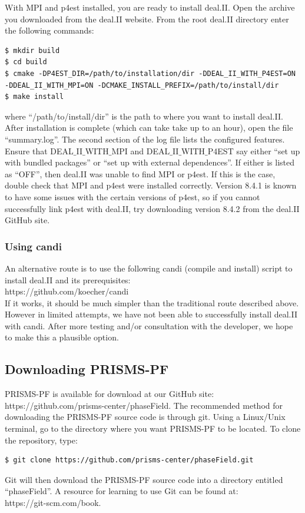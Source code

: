 \documentclass[10pt]{article} %
\begin{document}
With MPI and p4est installed, you are ready to install deal.II. Open the archive you downloaded from the deal.II website. From the root deal.II directory enter the following commands:
\begin{lstlisting}
$ mkdir build
$ cd build
$ cmake -DP4EST_DIR=/path/to/installation/dir -DDEAL_II_WITH_P4EST=ON 
-DDEAL_II_WITH_MPI=ON -DCMAKE_INSTALL_PREFIX=/path/to/install/dir
$ make install
\end{lstlisting}
where ``/path/to/install/dir'' is the path to where you want to install deal.II. After installation is complete (which can take take up to an hour), open the file ``summary.log''. The second section of the log file lists the configured features. Ensure that DEAL$\_$II$\_$WITH$\_$MPI and DEAL$\_$II$\_$WITH$\_$P4EST say either ``set up with bundled packages'' or ``set up with external dependences''. If either is listed as ``OFF'', then deal.II was unable to find MPI or p4est. If this is the case, double check that MPI and p4est were installed correctly. Version 8.4.1 is known to have some issues with the certain versions of p4est, so if you cannot successfully link p4est with deal.II, try downloading version 8.4.2 from the deal.II GitHub site.

\subsubsection{Using candi}
An alternative route is to use the following candi (compile and install) script to install deal.II and its prerequisites: \\
https://github.com/koecher/candi \\

If it works, it should be much simpler than the traditional route described above. However in limited attempts, we have not been able to successfully install deal.II with candi. After more testing and/or consultation with the developer, we hope to make this a plausible option.

\subsection{Downloading PRISMS-PF}
PRISMS-PF is available for download at our GitHub site: https://github.com/prisms-center/phaseField. The recommended method for downloading the PRISMS-PF source code is through git. Using a Linux/Unix terminal, go to the directory where you want PRISMS-PF to be located. To clone the repository, type:
\begin{lstlisting}
$ git clone https://github.com/prisms-center/phaseField.git
\end{lstlisting}
Git will then download the PRISMS-PF source code into a directory entitled ``phaseField''. A resource for learning to use Git can be found at: \\https://git-scm.com/book.
\end{document}
